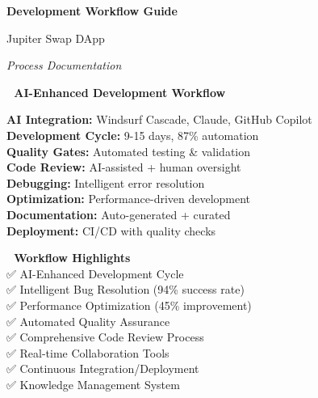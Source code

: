 \documentclass[11pt,a4paper]{article}
\begin{document}
\begin{titlepage}
    \centering
    \vspace*{1cm}
    
    {\Huge\textbf{\textcolor{jupiterBlue}{Development Workflow Guide}}\par}
    \vspace{0.5cm}
    {\LARGE\textcolor{deauraPurple}{Jupiter Swap DApp}\par}
    \vspace{0.3cm}
    {\Large\textit{Process Documentation}\par}
    
    \vspace{1.5cm}
    
    \begin{tcolorbox}[colback=jupiterBlue!10,colframe=jupiterBlue,width=0.9\textwidth]
        \centering
        \textbf{🔄 AI-Enhanced Development Workflow}\\
        \vspace{0.5cm}
        \begin{multicols}{2}
        \textbf{AI Integration:} Windsurf Cascade, Claude, GitHub Copilot\\
        \textbf{Development Cycle:} 9-15 days, 87\% automation\\
        \textbf{Quality Gates:} Automated testing \& validation\\
        \textbf{Code Review:} AI-assisted + human oversight\\
        \textbf{Debugging:} Intelligent error resolution\\
        \textbf{Optimization:} Performance-driven development\\
        \textbf{Documentation:} Auto-generated + curated\\
        \textbf{Deployment:} CI/CD with quality checks
        \end{multicols}
    \end{tcolorbox}
    
    \vspace{1.5cm}
    
    \begin{tcolorbox}[colback=successGreen!10,colframe=successGreen,width=0.8\textwidth]
        \centering
        \textbf{🚀 Workflow Highlights}\\
        \vspace{0.3cm}
        ✅ AI-Enhanced Development Cycle\\
        ✅ Intelligent Bug Resolution (94\% success rate)\\
        ✅ Performance Optimization (45\% improvement)\\
        ✅ Automated Quality Assurance\\
        ✅ Comprehensive Code Review Process\\
        ✅ Real-time Collaboration Tools\\
        ✅ Continuous Integration/Deployment\\
        ✅ Knowledge Management System
    \end{tcolorbox}
    

\end{titlepage}
\end{document}
